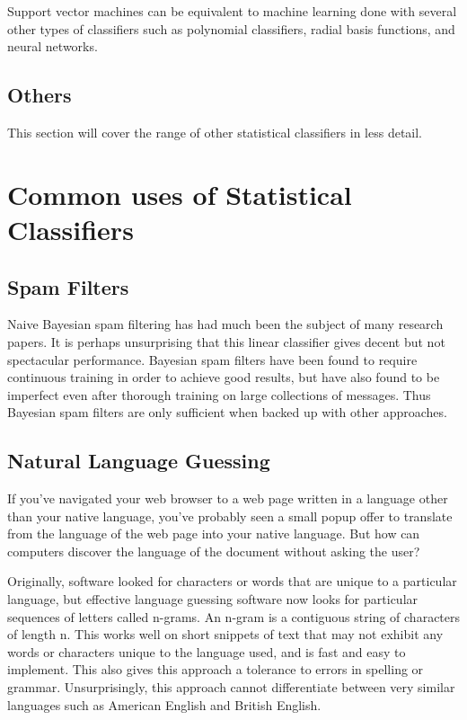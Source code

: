 \documentclass[12pt]{article}
\begin{document}
Support vector machines can be equivalent to machine learning done with several other types of classifiers
such as polynomial classifiers, radial basis functions, and neural networks. \cite{hearst1998support}
\subsection{Others}
This section will cover the range of other statistical classifiers in less detail.
\section{Common uses of Statistical Classifiers}
\subsection{Spam Filters}
Naive Bayesian spam filtering has had much been the subject of many research papers. It is perhaps
unsurprising that this linear classifier gives decent but not spectacular performance.  Bayesian spam filters
have been found to require continuous training in order to achieve good results, but have also found to be
imperfect even after thorough training on large collections of messages. Thus Bayesian spam filters are only
sufficient when backed up with other approaches.  \cite{androutsopoulos2000evaluation}
\subsection{Natural Language Guessing}
If you've navigated your web browser to a web page written in a language other than your native language,
you've probably seen a small popup offer to translate from the language of the web page into your native
language. But how can computers discover the language of the document without asking the user?

Originally, software looked for characters or words that are unique to a particular language, but effective
language guessing software now looks for particular sequences of letters called n-grams. An n-gram is a
contiguous string of characters of length n. This works well on short snippets of text that may not exhibit
any words or characters unique to the language used, and is fast and easy to implement. This also gives this
approach a tolerance to errors in spelling or grammar. Unsurprisingly, this approach cannot differentiate
between very similar languages such as American English and British English. \cite{martins2005language}
\end{document}
